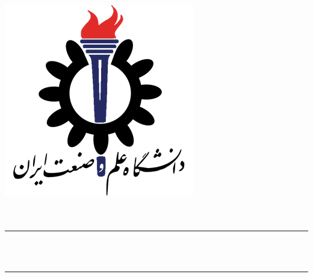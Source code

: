 \begin{titlepage}
    \centering
    \includegraphics[scale = 0.5]{Images/IUSTLogo.png}\\
    \Huge{\Faculty}\\[0.2 cm]
    \huge{\Course}\\[0.2 cm]

    \rule{\linewidth}{1.0 mm}
    \textbf{\ProjectTitle}\\[0.3 cm]
    \huge{\Subject}\\[0.2 cm]
    \LARGE{\Title}
    \rule{\linewidth}{1.0 mm}\\[1.0 cm]
    
    \begin{minipage}{0.95 \textwidth}
        \centering
	    \Name
	\end{minipage}

\end{titlepage}